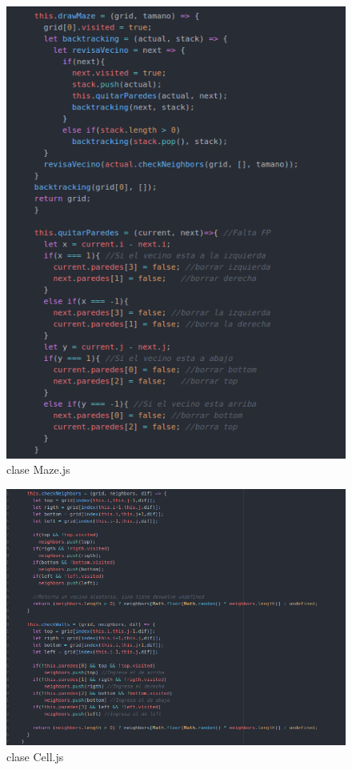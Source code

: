 \documentclass[11pt]{article}
\begin{document}
\begin{figure}[H] 
\includegraphics[scale=0.5]{maze}
\centering
\caption{clase Maze.js}
\end{figure}

\begin{figure}[H] 
\includegraphics[scale=0.5]{cell}
\centering
\caption{clase Cell.js}
\end{figure}
\end{document}
